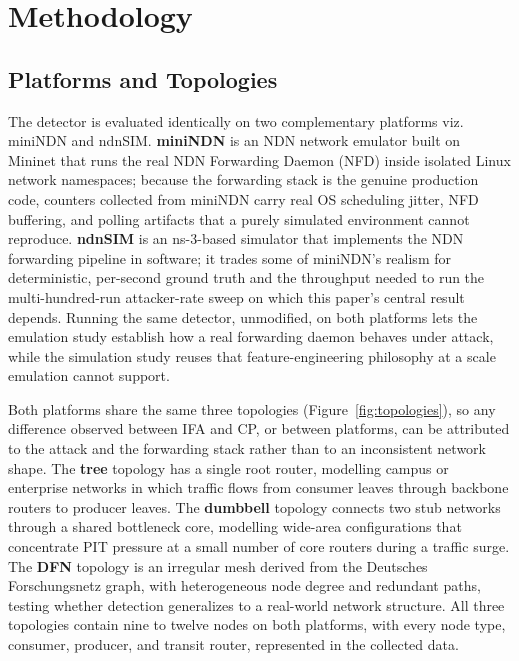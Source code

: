 \section{Methodology}
\label{sec:method}

\subsection{Platforms and Topologies}

The detector is evaluated identically on two complementary platforms viz. miniNDN and ndnSIM. \textbf{miniNDN} \cite{cabral2013mini} is an NDN network emulator built on Mininet that runs the real NDN Forwarding Daemon (NFD) inside isolated Linux network namespaces; because the forwarding stack is the genuine production code, counters collected from miniNDN carry real OS scheduling jitter, NFD buffering, and polling artifacts that a purely simulated environment cannot reproduce. \textbf{ndnSIM} \cite{mastorakis2015ndnsim} is an ns-3-based simulator that implements the NDN forwarding pipeline in software; it trades some of miniNDN's realism for deterministic, per-second ground truth and the throughput needed to run the multi-hundred-run attacker-rate sweep on which this paper's central result depends. Running the same detector, unmodified, on both platforms lets the emulation study establish how a real forwarding daemon behaves under attack, while the simulation study reuses that feature-engineering philosophy at a scale emulation cannot support.

Both platforms share the same three topologies (Figure~\ref{fig:topologies}), so any difference observed between IFA and CP, or between platforms, can be attributed to the attack and the forwarding stack rather than to an inconsistent network shape. The \textbf{tree} topology has a single root router, modelling campus or enterprise networks in which traffic flows from consumer leaves through backbone routers to producer leaves. The \textbf{dumbbell} topology connects two stub networks through a shared bottleneck core, modelling wide-area configurations that concentrate PIT pressure at a small number of core routers during a traffic surge. The \textbf{DFN} topology is an irregular mesh derived from the Deutsches Forschungsnetz graph, with heterogeneous node degree and redundant paths, testing whether detection generalizes to a real-world network structure. All three topologies contain nine to twelve nodes on both platforms, with every node type, consumer, producer, and transit router, represented in the collected data.

